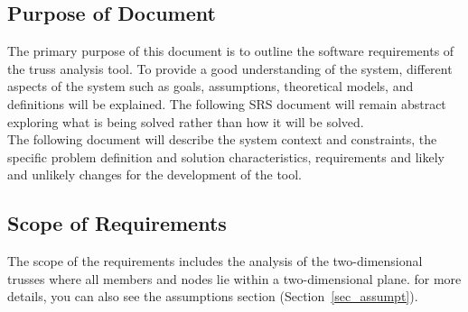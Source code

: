 \documentclass[12pt]{article}
\begin{document}
\subsection{Purpose of Document}
{The primary purpose of this document is to outline the software requirements of the truss analysis tool. To provide a good understanding of the system, different aspects of the system such as  goals, assumptions, theoretical models, and definitions will be explained.  The following SRS document will remain abstract exploring what is being solved rather than how it will be solved.\\
The following document will describe the system context and constraints, the specific problem definition and solution characteristics, requirements and likely and unlikely changes for the 
development of the tool.}

\subsection{Scope of Requirements} 
{The scope of the requirements includes the analysis of the two-dimensional trusses where all members and nodes lie within a two-dimensional plane. for more details, you can also see the assumptions section  (Section~\ref{sec_assumpt}). }

\end{document}
